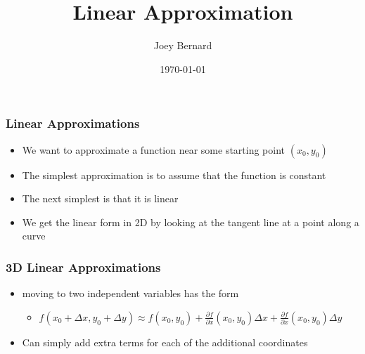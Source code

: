 \documentclass{beamer}
\title{Linear Approximation}
\author{Joey Bernard}
\institute{University of New Brunswick}
\date{\today}
\begin{document}
\begin{frame}
  \titlepage
\end{frame}

\begin{frame}
  \frametitle{Linear Approximations}
  \begin{itemize}
  \item We want to approximate a function near some starting point $(x_0, y_0)$
  \item The simplest approximation is to assume that the function is constant
  \item The next simplest is that it is linear
  \item We get the linear form in 2D by looking at the tangent line at a point along a curve
  \end{itemize}
\end{frame}

\begin{frame}
  \frametitle{3D Linear Approximations}
  \begin{itemize}
  \item moving to two independent variables has the form
    \begin{itemize}
    \item $f(x_0 + \Delta x, y_0 + \Delta y) \approx f(x_0, y_0) + \frac{\partial f}{\partial x}(x_0, y_0) \Delta x + \frac{\partial f}{\partial x}(x_0, y_0) \Delta y$
    \end{itemize}
    \item Can simply add extra terms for each of the additional coordinates
  \end{itemize}
\end{frame}
  
\end{document}

